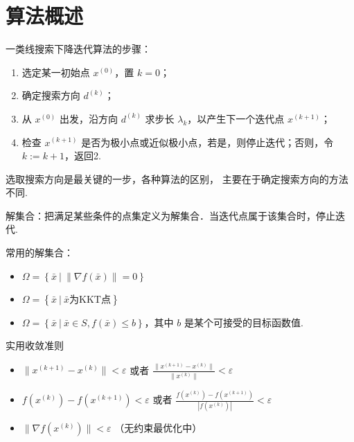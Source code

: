 \section{算法概述}
\begin{note}
    一类线搜索下降迭代算法的步骤：
    \begin{enumerate}
        \item 选定某一初始点 $x^{(0)}$，置 $k = 0$；
        \item 确定搜索方向 $d^{(k)}$；
        \item 从 $x^{(0)}$ 出发，沿方向 $d^{(k)}$ 求步长 $\lambda_k$，以产生下一个迭代点 $x^{(k + 1)}$；
        \item 检查 $x^{(k + 1)}$ 是否为极小点或近似极小点，若是，则停止迭代；否则，令 $k:= k + 1$，返回2.
    \end{enumerate}

    选取搜索方向是最关键的一步，各种算法的区别， 主要在于确定搜索方向的方法不同.
\end{note}

\begin{note}
    解集合：把满足某些条件的点集定义为解集合．当迭代点属于该集合时，停止迭代.
    
    常用的解集合：
    \begin{itemize}
        \item $\Omega = \left\{\bar{x}\ |\ \|\nabla f(\bar{x})\| = 0\right\}$
        \item $\Omega = \left\{\bar{x}\ |\ \bar{x} \text{为KKT点}\right\}$
        \item $\Omega = \left\{\bar{x}\ |\ \bar{x} \in S, f(\bar{x}) \le b\right\}$，其中 $b$ 是某个可接受的目标函数值.
    \end{itemize}
\end{note}

\begin{note}
    实用收敛准则
    \begin{itemize}
        \item $\|x^{(k + 1)} - x^{(k)}\| < \varepsilon$ 或者 $\frac{\|x^{(k + 1)} - x^{(k)}\|}{\|x^{(k)}\|} < \varepsilon$
        \item $f(x^{(k)}) - f(x^{(k + 1)}) < \varepsilon$ 或者 $\frac{f(x^{(k)}) - f(x^{(k + 1)})}{|f(x^{(k)})|} < \varepsilon$
        \item $\|\nabla f(x^{(k)})\| < \varepsilon$ （无约束最优化中）
    \end{itemize}
\end{note}

